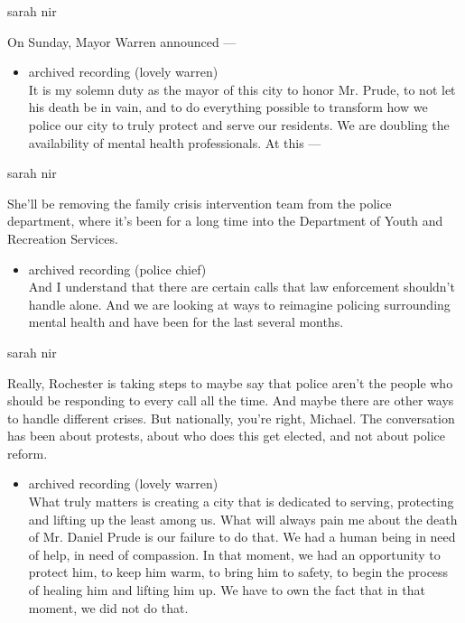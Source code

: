 sarah nir

On Sunday, Mayor Warren announced ---

\begin{itemize}
\tightlist
\item
  archived recording (lovely warren)\\
  It is my solemn duty as the mayor of this city to honor Mr. Prude, to
  not let his death be in vain, and to do everything possible to
  transform how we police our city to truly protect and serve our
  residents. We are doubling the availability of mental health
  professionals. At this ---
\end{itemize}

sarah nir

She'll be removing the family crisis intervention team from the police
department, where it's been for a long time into the Department of Youth
and Recreation Services.

\begin{itemize}
\tightlist
\item
  archived recording (police chief)\\
  And I understand that there are certain calls that law enforcement
  shouldn't handle alone. And we are looking at ways to reimagine
  policing surrounding mental health and have been for the last several
  months.
\end{itemize}

sarah nir

Really, Rochester is taking steps to maybe say that police aren't the
people who should be responding to every call all the time. And maybe
there are other ways to handle different crises. But nationally, you're
right, Michael. The conversation has been about protests, about who does
this get elected, and not about police reform.

\begin{itemize}
\tightlist
\item
  archived recording (lovely warren)\\
  What truly matters is creating a city that is dedicated to serving,
  protecting and lifting up the least among us. What will always pain me
  about the death of Mr. Daniel Prude is our failure to do that. We had
  a human being in need of help, in need of compassion. In that moment,
  we had an opportunity to protect him, to keep him warm, to bring him
  to safety, to begin the process of healing him and lifting him up. We
  have to own the fact that in that moment, we did not do that.
\end{itemize}

